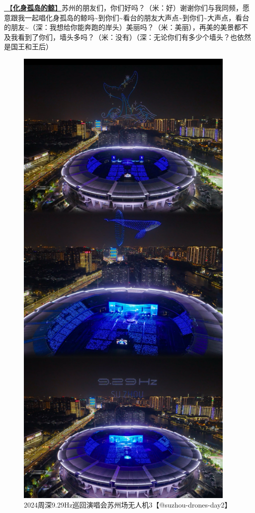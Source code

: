 \documentclass[]{ctexbook}
\begin{document}
\hyperref[hua-shen-gu-dao-de-jing]{🎵【\textbf{化身孤岛的鲸}】}苏州的朋友们，你们好吗？（米：好）谢谢你们与我同频，愿意跟我一起唱化身孤岛的鲸吗\textasciitilde 到你们\textasciitilde 看台的朋友大声点\textasciitilde 到你们\textasciitilde 大声点，看台的朋友\textasciitilde（深：我想给你能奔跑的岸头）美丽吗？（米：美丽），再美的美景都不及我看到了你们，墙头多吗？（米：没有）（深：无论你们有多少个墙头？也依然是国王和王后）

\begin{figure}

{\centering \includegraphics[width=300pt]{img/suzhou20241110/001} 

}

\caption{2024周深9.29Hz巡回演唱会苏州场无人机3【@suzhou-drones-day2】}\label{fig:unnamed-chunk-112}
\end{figure}
\end{document}
